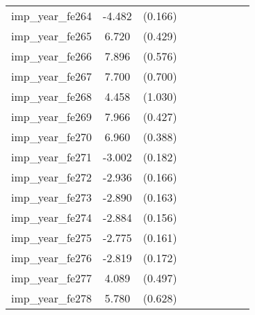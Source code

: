 {\begin{tabular}{l*{4}{cc}}
imp\_year\_fe264&   -4.482\sym{***}&  (0.166)&                  &         &                  &         &                  &         \\
imp\_year\_fe265&    6.720\sym{***}&  (0.429)&                  &         &                  &         &                  &         \\
imp\_year\_fe266&    7.896\sym{***}&  (0.576)&                  &         &                  &         &                  &         \\
imp\_year\_fe267&    7.700\sym{***}&  (0.700)&                  &         &                  &         &                  &         \\
imp\_year\_fe268&    4.458\sym{***}&  (1.030)&                  &         &                  &         &                  &         \\
imp\_year\_fe269&    7.966\sym{***}&  (0.427)&                  &         &                  &         &                  &         \\
imp\_year\_fe270&    6.960\sym{***}&  (0.388)&                  &         &                  &         &                  &         \\
imp\_year\_fe271&   -3.002\sym{***}&  (0.182)&                  &         &                  &         &                  &         \\
imp\_year\_fe272&   -2.936\sym{***}&  (0.166)&                  &         &                  &         &                  &         \\
imp\_year\_fe273&   -2.890\sym{***}&  (0.163)&                  &         &                  &         &                  &         \\
imp\_year\_fe274&   -2.884\sym{***}&  (0.156)&                  &         &                  &         &                  &         \\
imp\_year\_fe275&   -2.775\sym{***}&  (0.161)&                  &         &                  &         &                  &         \\
imp\_year\_fe276&   -2.819\sym{***}&  (0.172)&                  &         &                  &         &                  &         \\
imp\_year\_fe277&    4.089\sym{***}&  (0.497)&                  &         &                  &         &                  &         \\
imp\_year\_fe278&    5.780\sym{***}&  (0.628)&                  &         &                  &         &                  &         \\

\end{tabular}}

